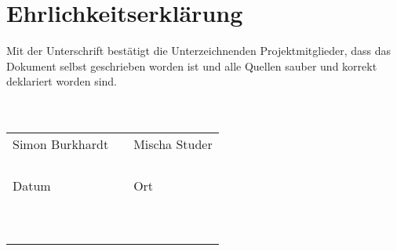 \section{Ehrlichkeitserklärung}\label{sec:Ehrlichkeitserklärung}

Mit der Unterschrift bestätigt die Unterzeichnenden Projektmitglieder, dass das Dokument selbst geschrieben
worden ist und alle Quellen sauber und korrekt deklariert worden sind.\\


\ \\
\ \\

\begin{center}
		\renewcommand{\arraystretch}{1}
	\begin{tabular}{lp{5em}l} 
  
		Simon Burkhardt  && Mischa Studer \\
		&&\\
		\hspace{5cm}   && \hspace{5cm} \\\cline{1-1}\cline{3-3}\\
		&&\\
		Datum  && Ort \\
		&&\\
		\hspace{5cm}   && \hspace{5cm} \\\cline{1-1}\cline{3-3}
		&&\\
		&&\\
		

  
  \ \\
  \hline \hline \\
 \end{tabular}
 \end{center}


